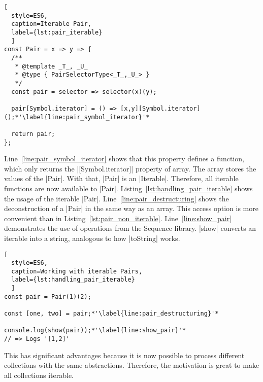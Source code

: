 \begin{lstlisting}[
  style=ES6, 
  caption=Iterable Pair,
  label={lst:pair_iterable}
  ]
const Pair = x => y => {
  /**
   * @template _T_, _U_
   * @type { PairSelectorType<_T_,_U_> }
   */
  const pair = selector => selector(x)(y);

  pair[Symbol.iterator] = () => [x,y][Symbol.iterator]();*'\label{line:pair_symbol_iterator}'*

  return pair;
};
\end{lstlisting}

Line~\ref{line:pair_symbol_iterator} shows that 
this property defines a function, which only returns the |[Symbol.iterator]| 
property of array. The array stores the values of the |Pair|. With that, |Pair|
is an |Iterable|. Therefore, all iterable functions are now available to |Pair|.
Listing~\ref{lst:handling_pair_iterable} shows the usage of the iterable |Pair|. 
Line~\ref{line:pair_destructuring} shows the deconstruction of a |Pair| in the same way as an array. 
This access option is more convenient than in Listing~\ref{lst:pair_non_iterable}. 
Line~\ref{line:show_pair} demonstrates the use of operations from the Sequence 
library. |show| converts an iterable into a string, analogous to how |toString|
works.

\begin{lstlisting}[
  style=ES6, 
  caption=Working with iterable Pairs,
  label={lst:handling_pair_iterable}
  ]
const pair = Pair(1)(2);

const [one, two] = pair;*'\label{line:pair_destructuring}'*

console.log(show(pair));*'\label{line:show_pair}'*
// => Logs '[1,2]'
\end{lstlisting}

This has significant advantages because it is now possible to process different 
collections with the same abstractions. Therefore, the motivation is great to 
make all collections iterable.

